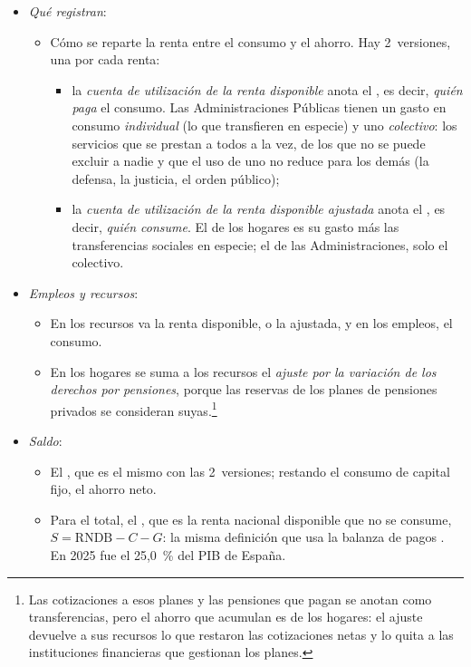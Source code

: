 \documentclass[11pt]{article}
\begin{document}
\begin{itemize}
\item \emph{Qué registran}:
  \begin{itemize}
  \item Cómo se reparte la renta entre el consumo y el ahorro. Hay 2~versiones, una por cada renta:
    \begin{itemize}
    \item la \emph{cuenta de utilización de la renta disponible} anota el , es decir, \emph{quién paga} el consumo. Las Administraciones Públicas tienen un gasto en consumo \emph{individual} (lo que transfieren en especie) y uno \emph{colectivo}: los servicios que se prestan a todos a la vez, de los que no se puede excluir a nadie y que el uso de uno no reduce para los demás (la defensa, la justicia, el orden público);
    \item la \emph{cuenta de utilización de la renta disponible ajustada} anota el , es decir, \emph{quién consume}. El de los hogares es su gasto más las transferencias sociales en especie; el de las Administraciones, solo el colectivo.
    \end{itemize}
  \end{itemize}
\item \emph{Empleos y recursos}:
  \begin{itemize}
  \item En los recursos va la renta disponible, o la ajustada, y en los empleos, el consumo.
  \item En los hogares se suma a los recursos el \emph{ajuste por la variación de los derechos por pensiones}, porque las reservas de los planes de pensiones privados se consideran suyas.\footnote{Las cotizaciones a esos planes y las pensiones que pagan se anotan como transferencias, pero el ahorro que acumulan es de los hogares: el ajuste devuelve a sus recursos lo que restaron las cotizaciones netas y lo quita a las instituciones financieras que gestionan los planes.}
  \end{itemize}
\item \emph{Saldo}:
  \begin{itemize}
  \item El , que es el mismo con las 2~versiones; restando el consumo de capital fijo, el ahorro neto.
  \item Para el total, el , que es la renta nacional disponible que no se consume, $S=\mathrm{RNDB}-C-G$: la misma definición que usa la balanza de pagos . En 2025 fue el 25,0~\% del PIB de España\nocite{Eurostat2026nasa10nftr}.

\end{itemize}
\end{itemize}
\end{document}
